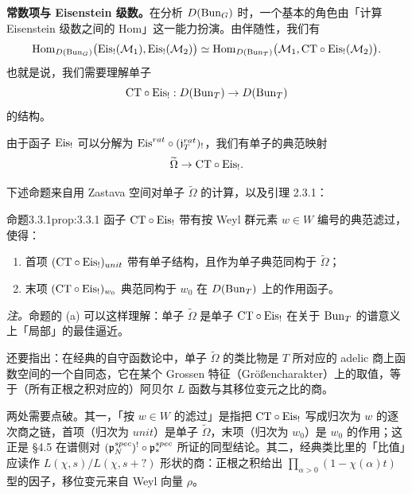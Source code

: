 \textbf{常数项与 Eisenstein 级数。}在分析 $D(\operatorname{Bun}_G)$ 时，一个基本的角色由「计算 Eisenstein 级数之间的 Hom」这一能力扮演。由伴随性，我们有
\[
  \operatorname{Hom}_{D(\operatorname{Bun}_G)}\bigl(\mathrm{Eis}_!(\mathcal M_1),\mathrm{Eis}_!(\mathcal M_2)\bigr)
  \simeq \operatorname{Hom}_{D(\operatorname{Bun}_T)}\bigl(\mathcal M_1,\mathrm{CT}\circ\mathrm{Eis}_!(\mathcal M_2)\bigr).
\]
也就是说，我们需要理解单子
\[
  \mathrm{CT}\circ\mathrm{Eis}_! : D(\operatorname{Bun}_T)\to D(\operatorname{Bun}_T)
\]
的结构。

由于函子 $\mathrm{Eis}_!$ 可以分解为 $\mathrm{Eis}^{rat}\circ(\mathfrak{j}^{rat}_T)_!$，我们有单子的典范映射
\[
  \widetilde\Omega\to\mathrm{CT}\circ\mathrm{Eis}_! .
\]

下述命题来自用 Zastava 空间对单子 $\widetilde\Omega$ 的计算，以及引理 2.3.1：

\begin{othm}{命题}{3.3.1}{prop:3.3.1}
函子 $\mathrm{CT}\circ\mathrm{Eis}_!$ 带有按 Weyl 群元素 $w\in W$ 编号的典范滤过，使得：
\begin{enumerate}[label=(\alph*), leftmargin=2.4em, itemsep=0.25em]
\item 首项 $(\mathrm{CT}\circ\mathrm{Eis}_!)_{unit}$ 带有单子结构，且作为单子典范同构于 $\widetilde\Omega$；
\item 末项 $(\mathrm{CT}\circ\mathrm{Eis}_!)_{w_0}$ 典范同构于 $w_0$ 在 $D(\operatorname{Bun}_T)$ 上的作用函子。
\end{enumerate}
\end{othm}

\emph{注。}命题的 (a) 可以这样理解：单子 $\widetilde\Omega$ 是单子 $\mathrm{CT}\circ\mathrm{Eis}_!$ 在关于 $\operatorname{Bun}_T$ 的谱意义上「局部」的最佳逼近。

还要指出：在经典的自守函数论中，单子 $\widetilde\Omega$ 的类比物是 $T$ 所对应的 adelic 商上函数空间的一个自同态，它在某个 Grossen 特征（Größencharakter）上的取值，等于（所有正根之积对应的）阿贝尔 $L$ 函数与其移位变元之比的商。

\begin{annote}
两处需要点破。其一，「按 $w\in W$ 的滤过」是指把 $\mathrm{CT}\circ\mathrm{Eis}_!$ 写成归次为 $w$ 的逐次商之链，首项（归次为 $unit$）是单子 $\widetilde\Omega$，末项（归次为 $w_0$）是 $w_0$ 的作用；这正是 §4.5 在谱侧对 $(\mathfrak{p}^{spec}_N)^!\circ\mathfrak{p}^{spec}_*$ 所证的同型结论。其二，经典类比里的「比值」应读作 $L(\chi,s)/L(\chi,s+?)$ 形状的商：正根之积给出 $\prod_{\alpha>0}(1-\chi(\alpha)t)$ 型的因子，移位变元来自 Weyl 向量 $\rho$。\par\vspace{0.15em}{\raggedleft 【来源：原书 p.5 §3.3（A）；经典自守形式论中 Eisenstein 级数的常数项公式（A）】\par}
\end{annote}
